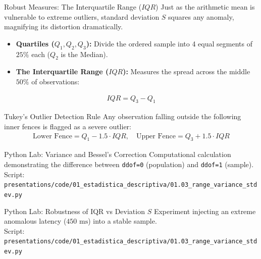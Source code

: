 \documentclass[aspectratio=169,xcolor={dvipsnames,table}]{beamer}
\begin{document}
\begin{frame}{Robust Measures: The Interquartile Range ($IQR$)}
  \scriptsize
  \vspace{-0.15cm}
  Just as the arithmetic mean is vulnerable to extreme outliers, standard deviation $S$ squares any anomaly, magnifying its distortion dramatically. \pause
  \begin{itemize}
    \item \textbf{Quartiles ($Q_1, Q_2, Q_3$):} Divide the ordered sample into 4 equal segments of $25\%$ each ($Q_2$ is the Median). \pause
    \item \textbf{The Interquartile Range ($IQR$):} Measures the spread across the middle $50\%$ of observations:
  \end{itemize}
  \begin{align}
    IQR = Q_3 - Q_1
  \end{align}
  \pause
  \begin{alertblock}{Tukey's Outlier Detection Rule}
    Any observation falling outside the following inner fences is flagged as a severe outlier:
    \begin{align}
      \text{Lower Fence} = Q_1 - 1.5 \cdot IQR, \quad \text{Upper Fence} = Q_3 + 1.5 \cdot IQR
    \end{align}
  \end{alertblock}
\end{frame}

\begin{frame}{Python Lab: Variance and Bessel's Correction}
  \scriptsize
  Computational calculation demonstrating the difference between \texttt{ddof=0} (population) and \texttt{ddof=1} (sample).
  \\ Script: \texttt{\footnotesize presentations/code/01\_estadistica\_descriptiva/01.03\_range\_variance\_stdev.py}
  
  \vspace{-0.1em}
  {\lstset{basicstyle=\ttfamily\tiny, aboveskip=0.2em, belowskip=0.2em}
  
  }
\end{frame}

\begin{frame}[fragile]{Python Lab: Robustness of IQR vs Deviation $S$}
  \scriptsize
  Experiment injecting an extreme anomalous latency ($450 \text{ ms}$) into a stable sample.
  \\ Script: \texttt{\footnotesize presentations/code/01\_estadistica\_descriptiva/01.03\_range\_variance\_stdev.py}
  
  \vspace{-0.1em}
  {\lstset{basicstyle=\ttfamily\tiny, aboveskip=0.2em, belowskip=0.2em}
  
  }
\end{frame}
\end{document}
